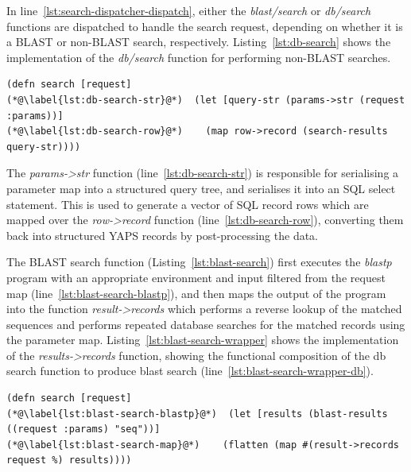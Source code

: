 In line~\ref{lst:search-dispatcher-dispatch}, either the
\textit{blast/search} or \textit{db/search} functions are dispatched
to handle the search request, depending on whether it is a BLAST or
non-BLAST search, respectively. Listing~\ref{lst:db-search} shows the
implementation of the \textit{db/search} function for performing
non-BLAST searches.


\lstset{language=clojure}
\begin{lstlisting}[label=lst:db-search,caption={%
      [The \textit{db} namespace search function]
      The \textit{db} namespace search function.}]
(defn search [request]
(*@\label{lst:db-search-str}@*)  (let [query-str (params->str (request :params))]
(*@\label{lst:db-search-row}@*)    (map row->record (search-results query-str))))
\end{lstlisting}

The \textit{params->str} function (line~\ref{lst:db-search-str}) is
responsible for serialising a parameter map into a structured query
tree, and serialises it into an SQL select statement. This is used to
generate a vector of SQL record rows which are mapped over the
\textit{row->record} function (line~\ref{lst:db-search-row}),
converting them back into structured YAPS records by post-processing
the data.

The BLAST search function (Listing~\ref{lst:blast-search}) first
executes the \textit{blastp} program with an appropriate environment
and input filtered from the request map
(line~\ref{lst:blast-search-blastp}), and then maps the output of the
program into the function \textit{result->records} which performs a
reverse lookup of the matched sequences and performs repeated database
searches for the matched records using the parameter
map. Listing~\ref{lst:blast-search-wrapper} shows the implementation
of the \textit{results->records} function, showing the functional
composition of the db search function to produce blast search
(line~\ref{lst:blast-search-wrapper-db}).


\lstset{language=clojure}
\begin{lstlisting}[label=lst:blast-search,caption={%
      [The \textit{blast} namespace search function]
      The \textit{blast} namespace search function.}]
(defn search [request]
(*@\label{lst:blast-search-blastp}@*)  (let [results (blast-results ((request :params) "seq"))]
(*@\label{lst:blast-search-map}@*)    (flatten (map #(result->records request %) results))))
\end{lstlisting}



